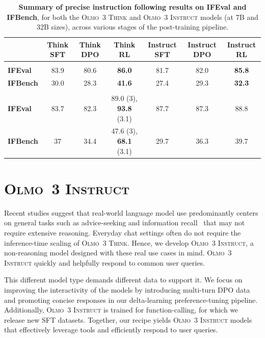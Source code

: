 \documentclass[table]{ai2style/ai2}
\newcommand{\newOlmo}{Olmo\xspace}
\newcommand{\olmothreeinstruct}{\textsc{\newOlmo~3 Instruct}\xspace}
\newcommand{\olmothreethinking}{\textsc{Olmo~3 Think}\xspace}
\begin{document}
{{\begin{table}[H]
\centering
\small
\begin{tabular}{lcccccc}
\toprule
                  & \textbf{Think SFT} & \textbf{Think DPO} & \textbf{Think RL}       & \textbf{Instruct SFT} & \textbf{Instruct DPO} & \textbf{Instruct RL} \\ 
\midrule
\rowcolor{midgrey} \multicolumn{7}{c}{\textbf{7B scale}} \\
\rowcolor{lightgrey} \textbf{IFEval}  & 83.9      & 80.6     & {\bf{86.0}} & 81.7           & 82.0         & {\bf{85.8}}         \\
\rowcolor{lightgrey}\textbf{IFBench} & 30.0      & 28.3      & {\bf{41.6}}  & 27.4         & 29.3         & {\bf 32.3}          \\
\rowcolor{midgrey} \multicolumn{7}{c}{\textbf{32B scale}} \\
\rowcolor{lightgrey} \textbf{IFEval}  & 83.7      & 82.3     & 89.0 (3), {\bf 93.8} (3.1) & 87.7           & 87.3         & 88.8         \\
\rowcolor{lightgrey} \textbf{IFBench} & 37    & 34.4     & 47.6 (3), {\bf 68.1} (3.1)  & 29.7         & 36.3         & 39.7          \\ 
\bottomrule
\end{tabular}
\caption{\textbf{Summary of precise instruction following results on IFEval and IFBench}, for both the \olmothreethinking and \olmothreeinstruct models (at 7B and 32B sizes), across various stages of the post-training pipeline.}
\label{tab:if_summary}
\end{table}

\section{\olmothreeinstruct} \label{sec:posttrain-instruct}

 Recent studies suggest that real-world language model use predominantly centers on general tasks such as advice-seeking and information recall~\citep{Chatterji2025-fs} that may not require extensive reasoning. 
 Everyday chat settings often do not require the inference-time scaling of \olmothreethinking. Hence, we develop \olmothreeinstruct, a non-reasoning model designed with these real use cases in mind. \olmothreeinstruct  quickly and helpfully respond to common user queries.

This different model type demands different data to support it. 
We focus on improving the interactivity of the models by introducing multi-turn DPO data and promoting concise responses in our delta-learning preference-tuning pipeline. 
Additionally, \olmothreeinstruct is trained for function-calling, for which we release new SFT datasets. 
Together, our recipe yields \olmothreeinstruct models that effectively leverage tools and efficiently respond to user queries. 

}}
\end{document}
